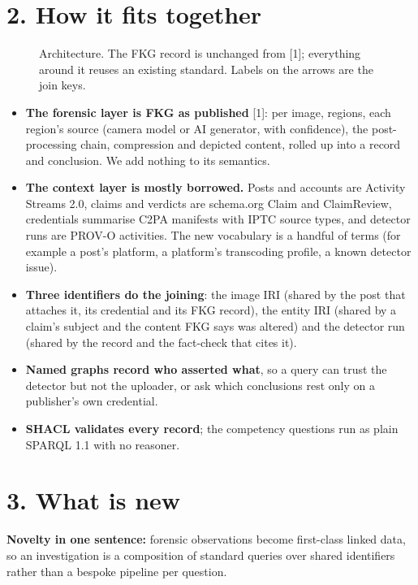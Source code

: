 \documentclass[11pt]{article}
\begin{document}
\section*{2. How it fits together}
\begin{figure}[tbp]\centering

\caption{Architecture. The FKG record is unchanged from [1]; everything around it reuses an existing standard. Labels on the arrows are the join keys.}
\end{figure}
\begin{itemize}
\item \textbf{The forensic layer is FKG as published} [1]: per image, regions, each region's source (camera model or AI generator, with confidence), the post-processing chain, compression and depicted content, rolled up into a record and conclusion. We add nothing to its semantics.
\item \textbf{The context layer is mostly borrowed.} Posts and accounts are Activity Streams 2.0, claims and verdicts are schema.org Claim and ClaimReview, credentials summarise C2PA manifests with IPTC source types, and detector runs are PROV-O activities. The new vocabulary is a handful of terms (for example a post's platform, a platform's transcoding profile, a known detector issue).
\item \textbf{Three identifiers do the joining}: the image IRI (shared by the post that attaches it, its credential and its FKG record), the entity IRI (shared by a claim's subject and the content FKG says was altered) and the detector run (shared by the record and the fact-check that cites it).
\item \textbf{Named graphs record who asserted what}, so a query can trust the detector but not the uploader, or ask which conclusions rest only on a publisher's own credential.
\item \textbf{SHACL validates every record}; the competency questions run as plain SPARQL 1.1 with no reasoner.
\end{itemize}
\section*{3. What is new}
\textbf{Novelty in one sentence:} forensic observations become first-class linked data, so an investigation is a composition of standard queries over shared identifiers rather than a bespoke pipeline per question.
\end{document}
